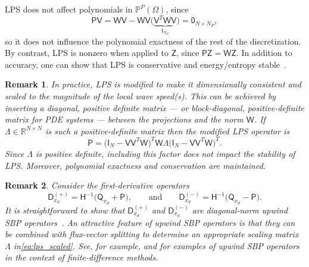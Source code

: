 \documentclass[pdflatex,sn-mathphys-num]{sn-jnl}%
\theoremstyle{thmstyleone}%
\theoremstyle{thmstyletwo}%
\newtheorem{remark}{Remark}%
\theoremstyle{thmstylethree}%
\newcommand{\mat}[1]{\ensuremath{\mathsf{#1}}}
\begin{document}
LPS does not affect polynomials in $\mathbb{P}^{P}(\Omega)$, since 
\begin{equation*}
    \mat{P} \mat{V} = \mat{W} \mat{V} - \mat{W} \mat{V} \big( \underbrace{\mat{V}^T \mat{W} \mat{V}}_{\displaystyle \mat{I}_{N_P}} \big) = \mat{0}_{N \times N_P},
\end{equation*}
so it does not influence the polynomial exactness of the rest of the discretization.  By contrast, LPS is nonzero when applied to $\mat{Z}$, since $\mat{P} \mat{Z} = \mat{W} \mat{Z}$.  In addition to accuracy, one can show that LPS is conservative and energy/entropy stable~\cite{Hicken2020entropy}.

\begin{remark}\label{rmk:lps_scaling}
In practice, LPS is modified to make it dimensionally consistent and scaled to the magnitude of the local wave speed(s).  This can be achieved by inserting a diagonal, positive definite matrix --- or block-diagonal, positive-definite matrix for PDE systems --- between the projections and the norm $\mat{W}$.  If $\mat{\Lambda} \in \mathbb{R}^{N\times N}$ is such a positive-definite matrix then the modified LPS operator is
\begin{equation}\label{eq:lps_scaled}
    \mat{P} =  \big( \mat{I}_{N} - \mat{V} \mat{V}^T \mat{W} \big)^T \mat{W} \mat{\Lambda} \big( \mat{I}_{N} - \mat{V} \mat{V}^T \mat{W} \big)^T.
\end{equation}
Since $\mat{\Lambda}$ is positive definite, including this factor does not impact the stability of LPS.  Moreover, polynomial exactness and conservation are maintained.
\end{remark}

\begin{remark}
Consider the first-derivative operators 
\begin{equation*}
    \mat{D}_{x_d}^{(+)} = \mat{H}^{-1} \big( \mat{Q}_{x_d} + \mat{P} \big),
    \qquad\text{and}\qquad
    \mat{D}_{x_d}^{(-)} = \mat{H}^{-1} \big( \mat{Q}_{x_d} - \mat{P} \big).
\end{equation*}
It is straightforward to show that $\mat{D}_{x_d}^{(+)}$ and $\mat{D}_{x_d}^{(-)}$ are diagonal-norm upwind SBP operators~\cite{Mattsson2017upwindSBP}.  An attractive feature of upwind SBP operators is that they can be combined with flux-vector splitting to determine an appropriate scaling matrix $\mat{\Lambda}$ in\eqref{eq:lps_scaled}. See, for example, \cite{Lundgren2020efficient} and \cite{Hew2025strongly} for examples of upwind SBP operators in the context of finite-difference methods.
\end{remark}
\end{document}
